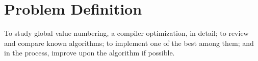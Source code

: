 \chapter{Problem Definition}

To study global value numbering, a compiler optimization, in detail; to review and compare known algorithms; to implement one of the best among them; and in the process, improve upon the algorithm if possible.
